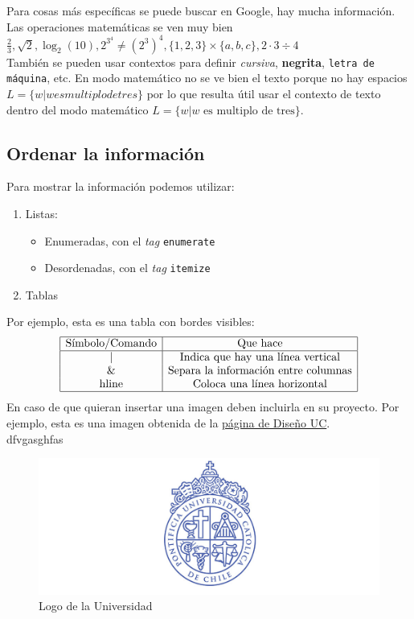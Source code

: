 \documentclass[12pt]{article}
\begin{document}
Para cosas más específicas se puede buscar en Google, hay mucha información. Las operaciones matemáticas se ven muy bien $\frac{2}{3}, \sqrt{2}, \log_{2}(10), 2^{3^{4}} \neq (2^{3})^{4}, \{1, 2, 3\} \times \{a, b, c\}, 2 \cdot 3 \div 4$\\

También se pueden usar contextos para definir \textit{cursiva}, \textbf{negrita}, \texttt{letra de máquina}, etc. En modo matemático no se ve bien el texto porque no hay espacios $L = \{ w | w es multiplo de tres\}$ por lo que resulta útil usar el contexto de texto dentro del modo matemático $L = \{ w | w \text{ es multiplo de tres}\}$.

\subsection*{Ordenar la información}
Para mostrar la información podemos utilizar:
\begin{enumerate}
		        \item Listas:
		        \begin{itemize}
		            \item Enumeradas, con el \textit{tag} \texttt{enumerate}
		            \item Desordenadas, con el \textit{tag} \texttt{itemize}
		        \end{itemize}
		        \item Tablas
		    \end{enumerate}

Por ejemplo, esta es una tabla con bordes visibles:
		    \[
		    \begin{array}{|c|c|}
		    \hline
		         \text{Símbolo/Comando} & \text{Que hace}  \\ \hline
		         \text{|} & \text{Indica que hay una línea vertical} \\
		         \text{\&} & \text{Separa la información entre columnas} \\
		         \text{hline} & \text{Coloca una línea horizontal} \\
		         \hline
		    \end{array}
		    \]
En caso de que quieran insertar una imagen deben incluirla en su proyecto. Por ejemplo, esta es una imagen obtenida de la \href{https://diseno.uc.cl/lineas-investigacion/lineas-de-investigacion/diseno-grafico-y-comunicacion-visual/escudo-uc/}{\color{blue}página de Diseño UC}.\\
dfvgasghfas
\begin{figure}[h]
    \centering
    \includegraphics[width=\textwidth]{uc.jpg}
    \caption{Logo de la Universidad}
    \label{fig:my_label}
\end{figure}

\newpage
\end{document}

